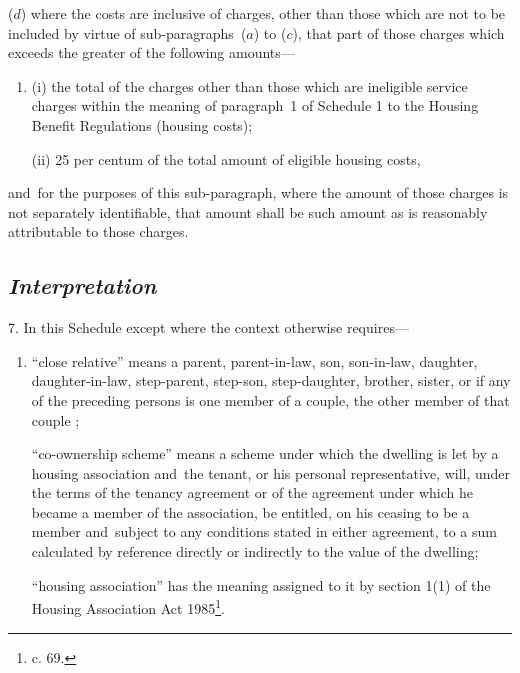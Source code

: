 \documentclass[12pt,a4paper]{article}
\begin{document}
\begin{enumerate}
($d$) where the costs are inclusive of charges, other than those which are not to be included by virtue of sub-paragraphs~($a$) to ($c$), that part of those charges which exceeds the greater of the following amounts—
\begin{enumerate}\item[]
(i) the total of the charges other than those which are ineligible service charges within the meaning of paragraph~1 of Schedule 1 to the Housing Benefit Regulations (housing costs);

(ii) 25 per centum of the total amount of eligible housing costs,
\end{enumerate}
and~for the purposes of this sub-paragraph, where the amount of those charges is not separately identifiable, that amount shall be such amount as is reasonably attributable to those charges.
\end{enumerate}


\subsection*{\itshape Interpretation}

7.  In this Schedule except where the context otherwise requires—
\begin{enumerate}\item[]
“close relative” means a parent, parent-in-law, son, son-in-law, daughter, daughter-in-law, step-parent, step-son, step-daughter, brother, sister, 
or if any of the preceding persons is one member of a couple, the other member of that couple%
;

“co-ownership scheme” means a scheme under which the dwelling is let by a housing association and~the tenant, or his personal representative, will, under the terms of the tenancy agreement or of the agreement under which he became a member of the association, be entitled, on his ceasing to be a member and~subject to any conditions stated in either agreement, to a sum calculated by reference directly or indirectly to the value of the dwelling;

“housing association” has the meaning assigned to it by section 1(1) of the Housing Association Act 1985\footnote{ c. 69.}.
\end{enumerate}
\end{document}
